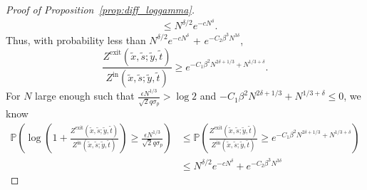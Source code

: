 \documentclass[11pt]{article}
\theoremstyle{definition}
\newcommand{\Prob}{\mathbb{P}}
\newcommand{\Zin}{Z^{\mathrm{in}}}
\newcommand{\Zexit}{Z^{\mathrm{exit}}}
\begin{document}
\begin{proof}[Proof of Proposition~\ref{prop:diff_loggamma}]
\[\begin{aligned}
&\leq N^{\delta/2}e^{-cN^{\delta}}.
\end{aligned}
\]
Thus, with probability less than $N^{\delta/2}e^{-cN^{\delta}}$ + $e^{-C_2\beta^3N^{3\delta}}$,
\begin{equation}
    \frac{\Zexit(\tilde{x}, \tilde{s};\tilde{y}, \tilde{t})}{\Zin(\tilde{x}, \tilde{s};\tilde{y}, \tilde{t})} \geq e^{-C_1 \beta^2 N^{2\delta + 1/3} + N^{1/3 + \delta}}.
\end{equation}
For $N$ large enough such that $\frac{\epsilon N^{1/3}}{\sqrt{2}q\sigma_p} > \log 2$ and ${-C_1 \beta^2 N^{2\delta + 1/3} + N^{1/3 + \delta}} \leq 0$, we know
\[
\begin{aligned}
    \Prob \left( \log\left(1+ \frac{\Zexit(\tilde{x}, \tilde{s};\tilde{y}, \tilde{t})}{\Zin(\tilde{x}, \tilde{s};\tilde{y}, \tilde{t})}\right) \geq \frac{\epsilon N^{1/3}}{\sqrt{2}q\sigma_p}\right) &
    \leq \Prob \left(  \frac{\Zexit(\tilde{x}, \tilde{s};\tilde{y}, \tilde{t})}{\Zin(\tilde{x}, \tilde{s};\tilde{y}, \tilde{t})} \geq e^{-C_1 \beta^2 N^{2\delta + 1/3} + N^{1/3 + \delta}} \right)\\
    &\leq N^{\delta/2}e^{-cN^{\delta}} + e^{-C_2\beta^3N^{3\delta}}
\end{aligned}
\]


\end{proof}
\end{document}
